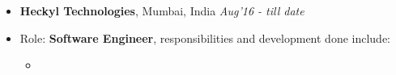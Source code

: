 \begin{itemize}
	\item \textbf{Heckyl Technologies}, Mumbai, India \hfill \emph{Aug'16 - till date}
	\item Role: \textbf{Software Engineer}, responsibilities and development done include:
	\begin{itemize}
		\item 
	\end{itemize}
\end{itemize}